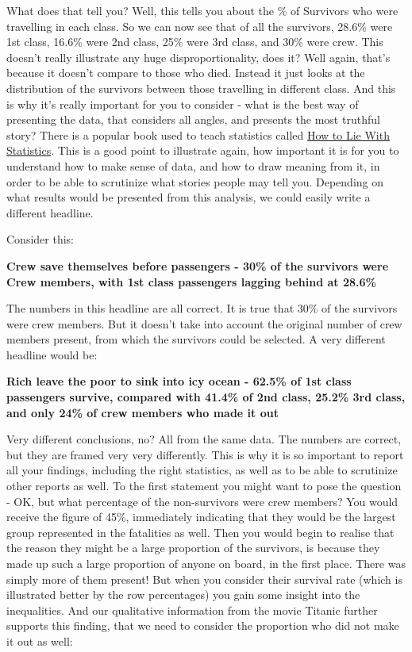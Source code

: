 \documentclass[
]{book}
\begin{document}
What does that tell you? Well, this tells you about the \% of Survivors who were travelling in each class. So we can now see that of all the survivors, 28.6\% were 1st class, 16.6\% were 2nd class, 25\% were 3rd class, and 30\% were crew. This doesn't really illustrate any huge disproportionality, does it? Well again, that's because it doesn't compare to those who died. Instead it just looks at the distribution of the survivors between those travelling in different class. And this is why it's really important for you to consider - what is the best way of presenting the data, that considers all angles, and presents the most truthful story? There is a popular book used to teach statistics called \href{https://en.wikipedia.org/wiki/How_to_Lie_with_Statistics}{How to Lie With Statistics}. This is a good point to illustrate again, how important it is for you to understand how to make sense of data, and how to draw meaning from it, in order to be able to scrutinize what stories people may tell you. Depending on what results would be presented from this analysis, we could easily write a different headline.

Consider this:

\textbf{Crew save themselves before passengers - 30\% of the survivors were Crew members, with 1st class passengers lagging behind at 28.6\%}

The numbers in this headline are all correct. It is true that 30\% of the survivors were crew members. But it doesn't take into account the original number of crew members present, from which the survivors could be selected. A very different headline would be:

\textbf{Rich leave the poor to sink into icy ocean - 62.5\% of 1st class passengers survive, compared with 41.4\% of 2nd class, 25.2\% 3rd class, and only 24\% of crew members who made it out}

Very different conclusions, no? All from the same data. The numbers are correct, but they are framed very very differently. This is why it is so important to report all your findings, including the right statistics, as well as to be able to scrutinize other reports as well. To the first statement you might want to pose the question - OK, but what percentage of the non-survivors were crew members? You would receive the figure of 45\%, immediately indicating that they would be the largest group represented in the fatalities as well. Then you would begin to realise that the reason they might be a large proportion of the survivors, is because they made up such a large proportion of anyone on board, in the first place. There was simply more of them present! But when you consider their survival rate (which is illustrated better by the row percentages) you gain some insight into the inequalities. And our qualitative information from the movie Titanic further supports this finding, that we need to consider the proportion who did not make it out as well:
\end{document}
